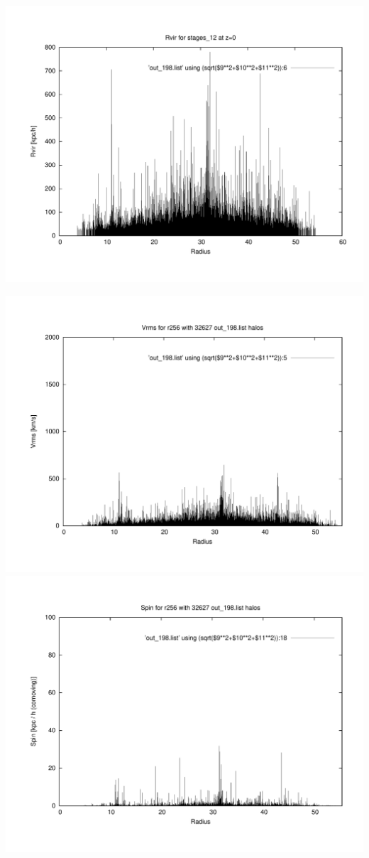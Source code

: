 \includegraphics[scale=0.3]{r256/h100/stages_12/plot_rvir_z0.pdf}

\includegraphics[scale=0.3]{r256/h100/stages_12/plot_Vrms_out_198.pdf}
\includegraphics[scale=0.3]{r256/h100/stages_12/plot_spin_out_198.pdf}

